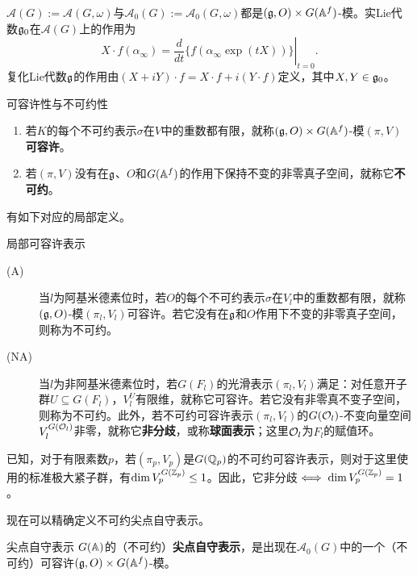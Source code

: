 $\mathcal A(G):=\mathcal A(G,\omega)$与$\mathcal A_0(G):=\mathcal A_0(G,\omega)$都是$(\mathfrak{g},O)\times G(\mathbb{A}^f)$-模。实Lie代数$\mathfrak{g}_0$在$\mathcal A(G)$上的作用为
\[X\cdot f(\alpha_\infty)=\left.\frac d{dt}\{f(\alpha_\infty\exp(tX))\}\right|_{t=0}.\]
复化Lie代数$\mathfrak{g}$的作用由$(X+iY)\cdot f=X\cdot f+i(Y\cdot f)$定义，其中$X,Y\in\mathfrak{g}_0$。
\begin{definition}{可容许性与不可约性}\label{L5S1O2}
\begin{enumerate}
\item 若$K$的每个不可约表示$\sigma$在$V$中的重数都有限，就称$(\mathfrak{g},O)\times G(\mathbb{A}^f)$-模$(\pi,V)$\textbf{可容许}。
\item 若$(\pi,V)$没有在$\mathfrak{g}$、$O$和$G(\mathbb{A}^f)$的作用下保持不变的非零真子空间，就称它\textbf{不可约}。
\end{enumerate}
\end{definition}
有如下对应的局部定义。
\begin{definition}{局部可容许表示}\label{L5S1O3}
\begin{description}
\item[(A)] 当$l$为阿基米德素位时，若$O$的每个不可约表示$\sigma$在$V_l$中的重数都有限，就称$(\mathfrak{g},O)$-模$(\pi_l,V_l)$可容许。若它没有在$\mathfrak{g}$和$O$作用下不变的非零真子空间，则称为不可约。
\item[(NA)] 当$l$为非阿基米德素位时，若$G(F_l)$的光滑表示$(\pi_l,V_l)$满足：对任意开子群$U\subseteq G(F_l)$，$V_l^U$有限维，就称它可容许。若它没有非零真不变子空间，则称为不可约。此外，若不可约可容许表示$(\pi_l,V_l)$的$G(\mathcal O_l)$-不变向量空间$V_l^{G(\mathcal O_l)}$非零，就称它\textbf{非分歧}，或称\textbf{球面表示}；这里$\mathcal O_l$为$F_l$的赋值环。
\end{description}
\end{definition}
\begin{note}[L5S1O4]
已知，对于有限素数$p$，若$(\pi_p,V_p)$是$G(\mathbb{Q}_p)$的不可约可容许表示，则对于这里使用的标准极大紧子群，有$\dim V_p^{G(\mathbb{Z}_p)}\leq1$。因此，它非分歧$\iff\dim V_p^{G(\mathbb{Z}_p)}=1$。
\end{note}
现在可以精确定义不可约尖点自守表示。
\begin{definition}{尖点自守表示}\label{L5S1O5}
$G(\mathbb{A})$的（不可约）\textbf{尖点自守表示}，是出现在$\mathcal A_0(G)$中的一个（不可约）可容许$(\mathfrak{g},O)\times G(\mathbb{A}^f)$-模。
\end{definition}
